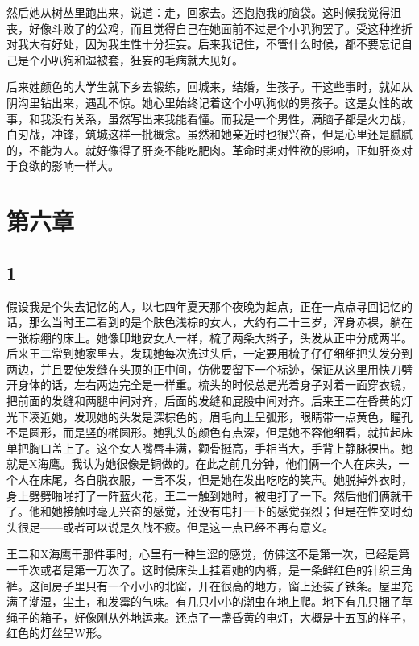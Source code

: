 然后她从树丛里跑出来，说道：走，回家去。还抱抱我的脑袋。这时候我觉得沮丧，好像斗败了的公鸡，而且觉得自己在她面前不过是个小叭狗罢了。受这种挫折对我大有好处，因为我生性十分狂妄。后来我记住，不管什么时候，都不要忘记自己是个小叭狗和湿被套，狂妄的毛病就大见好。 

后来姓颜色的大学生就下乡去锻练，回城来，结婚，生孩子。干这些事时，就如从阴沟里钻出来，遇乱不惊。她心里始终记着这个小叭狗似的男孩子。这是女性的故事，和我没有关系，虽然写出来我能看懂。而我是一个男性，满脑子都是火力战，白刃战，冲锋，筑城这样一批概念。虽然和她亲近时也很兴奋，但是心里还是腻腻的，不能为人。就好像得了肝炎不能吃肥肉。革命时期对性欲的影响，正如肝炎对于食欲的影响一样大。

\section{第六章}

\subsection{1}

假设我是个失去记忆的人，以七四年夏天那个夜晚为起点，正在一点点寻回记忆的话，那么当时王二看到的是个肤色浅棕的女人，大约有二十三岁，浑身赤裸，躺在一张棕绷的床上。她像印地安女人一样，梳了两条大辫子，头发从正中分成两半。后来王二常到她家里去，发现她每次洗过头后，一定要用梳子仔仔细细把头发分到两边，并且要使发缝在头顶的正中间，仿佛要留下一个标迹，保证从这里用快刀劈开身体的话，左右两边完全是一样重。梳头的时候总是光着身子对着一面穿衣镜，把前面的发缝和两腿中间对齐，后面的发缝和屁股中间对齐。后来王二在昏黄的灯光下凑近她，发现她的头发是深棕色的，眉毛向上呈弧形，眼睛带一点黄色，瞳孔不是圆形，而是竖的椭圆形。她乳头的颜色有点深，但是她不容他细看，就拉起床单把胸口盖上了。这个女人嘴唇丰满，颧骨挺高，手相当大，手背上静脉裸出。她就是X海鹰。我认为她很像是铜做的。在此之前几分钟，他们俩一个人在床头，一个人在床尾，各自脱衣服，一言不发，但是她在发出吃吃的笑声。她脱掉外衣时，身上劈劈啪啪打了一阵蓝火花，王二一触到她时，被电打了一下。然后他们俩就干了。他和她接触时毫无兴奋的感觉，还没有电打一下的感觉强烈；但是在性交时劲头很足——或者可以说是久战不疲。但是这一点已经不再有意义。 

王二和X海鹰干那件事时，心里有一种生涩的感觉，仿佛这不是第一次，已经是第一千次或者是第一万次了。这时候床头上挂着她的内裤，是一条鲜红色的针织三角裤。这间房子里只有一个小小的北窗，开在很高的地方，窗上还装了铁条。屋里充满了潮湿，尘土，和发霉的气味。有几只小小的潮虫在地上爬。地下有几只捆了草绳子的箱子，好像刚从外地运来。还点了一盏昏黄的电灯，大概是十五瓦的样子，红色的灯丝呈W形。 

